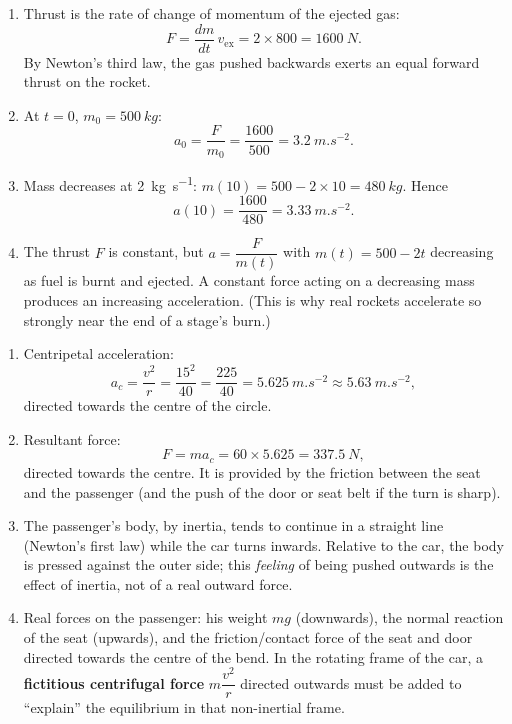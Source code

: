 \documentclass[11pt]{article}
\begin{document}
\begin{corrige}
\begin{enumerate}
\item Thrust is the rate of change of momentum of the ejected gas:
\[ F=\dfrac{dm}{dt}\,v_{\text{ex}}=2\times 800=\SI{1600}{N}. \]
By Newton's third law, the gas pushed backwards exerts an equal forward thrust on the rocket.
\item At $t=0$, $m_0=\SI{500}{kg}$:
\[ a_0=\dfrac{F}{m_0}=\dfrac{1600}{500}=\SI{3.2}{m.s^{-2}}. \]
\item Mass decreases at \SI{2}{kg.s^{-1}}: $m(10)=500-2\times 10=\SI{480}{kg}$. Hence
\[ a(10)=\dfrac{1600}{480}=\SI{3.33}{m.s^{-2}}. \]
\item The thrust $F$ is constant, but $a=\dfrac{F}{m(t)}$ with $m(t)=500-2t$ decreasing as fuel is burnt and ejected. A constant force acting on a decreasing mass produces an increasing acceleration. (This is why real rockets accelerate so strongly near the end of a stage's burn.)
\end{enumerate}
\end{corrige}

\begin{corrige}
\begin{enumerate}
\item Centripetal acceleration:
\[ a_c=\dfrac{v^2}{r}=\dfrac{15^2}{40}=\dfrac{225}{40}=\SI{5.625}{m.s^{-2}}\approx\SI{5.63}{m.s^{-2}}, \]
directed towards the centre of the circle.
\item Resultant force:
\[ F=ma_c=60\times 5.625=\SI{337.5}{N}, \]
directed towards the centre. It is provided by the friction between the seat and the passenger (and the push of the door or seat belt if the turn is sharp).
\item The passenger's body, by inertia, tends to continue in a straight line (Newton's first law) while the car turns inwards. Relative to the car, the body is pressed against the outer side; this \emph{feeling} of being pushed outwards is the effect of inertia, not of a real outward force.
\item Real forces on the passenger: his weight $mg$ (downwards), the normal reaction of the seat (upwards), and the friction/contact force of the seat and door directed towards the centre of the bend. In the rotating frame of the car, a \textbf{fictitious centrifugal force} $m\dfrac{v^2}{r}$ directed outwards must be added to ``explain'' the equilibrium in that non-inertial frame.
\end{enumerate}
\end{corrige}
\end{document}
